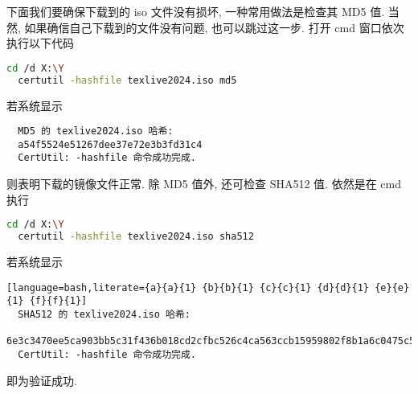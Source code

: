 下面我们要确保下载到的 iso 文件没有损坏, 一种常用做法是检查其 MD5 值.
当然, 如果确信自己下载到的文件没有问题, 也可以跳过这一步.
打开 \textsf{cmd} 窗口依次执行以下代码
\begin{lstlisting}[language = bash]
  cd /d X:\Y
  certutil -hashfile texlive2024.iso md5
\end{lstlisting}
若系统显示
\begin{lstlisting}
  MD5 的 texlive2024.iso 哈希:
  a54f5524e51267dee37e72e3b3fd31c4
  CertUtil: -hashfile 命令成功完成.
\end{lstlisting}
则表明下载的镜像文件正常.
除 MD5 值外,
还可检查 SHA512 值.
依然是在 \textsf{cmd} 执行
\begin{lstlisting}[language = bash]
  cd /d X:\Y
  certutil -hashfile texlive2024.iso sha512
\end{lstlisting}
若系统显示
\begin{lstlisting}[language=bash,literate={a}{a}{1} {b}{b}{1} {c}{c}{1} {d}{d}{1} {e}{e}{1} {f}{f}{1}]
  SHA512 的 texlive2024.iso 哈希:
  6e3c3470ee5ca903bb5c31f436b018cd2cfbc526c4ca563ccb15959802f8b1a6c0475c58566c1afaba19dc780fd192ac5511818ef5a89828d935c66c62cfcb2a
  CertUtil: -hashfile 命令成功完成.
\end{lstlisting}
即为验证成功.

